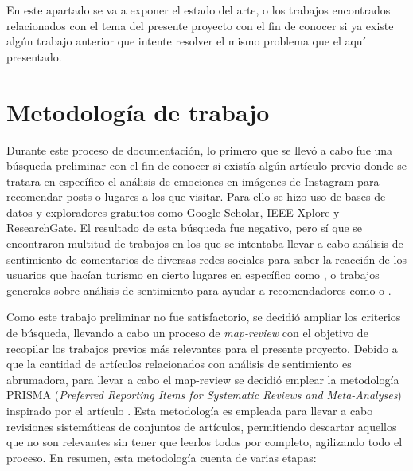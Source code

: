 
En este apartado se va a exponer el estado del arte, o los trabajos encontrados relacionados con el tema del presente proyecto con el fin de conocer si ya existe algún trabajo anterior que intente resolver el mismo problema que el aquí presentado.

\section{Metodología de trabajo}

Durante este proceso de documentación, lo primero que se llevó a cabo fue una búsqueda preliminar con el fin de conocer si existía algún artículo previo donde se tratara en específico el análisis de emociones en imágenes de Instagram para recomendar posts o lugares a los que visitar. Para ello se hizo uso de bases de datos y exploradores gratuitos como Google Scholar, IEEE Xplore y ResearchGate. El resultado de esta búsqueda fue negativo, pero sí que se encontraron multitud de trabajos en los que se intentaba llevar a cabo análisis de sentimiento de comentarios de diversas redes sociales para saber la reacción de los usuarios que hacían turismo en cierto lugares en específico como \cite{8720960}, o trabajos generales sobre análisis de sentimiento para ayudar a recomendadores como \cite{techniques_media_based_recom} o \cite{recom_sys_sen_analysis}.

Como este trabajo preliminar no fue satisfactorio, se decidió ampliar los criterios de búsqueda, llevando a cabo un proceso de \textit{map-review} con el objetivo de recopilar los trabajos previos más relevantes para el presente proyecto. Debido a que la cantidad de artículos relacionados con análisis de sentimiento es abrumadora, para llevar a cabo el map-review se decidió emplear la metodología PRISMA (\textit{Preferred Reporting Items for Systematic Reviews and Meta-Analyses}) inspirado por el artículo \cite{recom_metodo_tutor}. Esta metodología es empleada para llevar a cabo revisiones sistemáticas de conjuntos de artículos, permitiendo descartar aquellos que no son relevantes sin tener que leerlos todos por completo, agilizando todo el proceso. En resumen, esta metodología cuenta de varias etapas:

